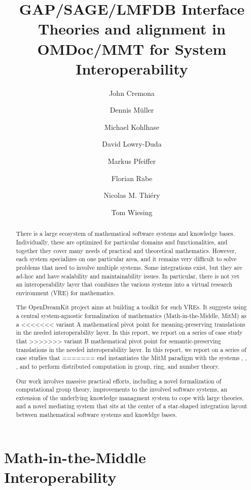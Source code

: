 \documentclass[book]{deliverablereport}
\title{GAP/SAGE/LMFDB Interface Theories and alignment in OMDoc/MMT for System Interoperability}
\author{John Cremona}
\author{Dennis M\"uller}
\author{Michael Kohlhase}
\author{David Lowry-Duda}
\author{Markus Pfeiffer}
\author{Florian Rabe}
\author{Nicolas M. Thiéry}
\author{Tom Wiesing}
\def\papertype{report\xspace}
\begin{document}
\begin{abstract}
  There is a large ecosystem of mathematical software systems and knowledge bases.
  Individually, these are optimized for particular domains and functionalities, and
  together they cover many needs of practical and theoretical mathematics.  However, each
  system specializes on one particular area, and it remains very difficult to solve
  problems that need to involve multiple systems.  Some integrations exist, but they are
  ad-hoc and have scalability and maintainability issues.  In particular, there is not yet
  an interoperability layer that combines the various systems into a virtual research
  environment (VRE) for mathematics.
  
  The OpenDreamKit project aims at building a toolkit for such VREs.  It suggests using a
  central system-agnostic formalization of mathematics (Math-in-the-Middle, MitM) as a
<<<<<<< variant A
  mathematical pivot point for meaning-preserving translations in the needed
  interoperability layer.  In this \papertype, we report on a series of case study that
>>>>>>> variant B
  mathematical pivot point for semantic-preserving translations in the needed
  interoperability layer.  In this \papertype, we report on a series of case studies that
======= end
  instantiates the MitM paradigm with the systems \GAP, \Sage, \LMFDB, and
  \Singular{} to perform distributed computation in group,
  ring, and number theory.
 
  Our work involves massive practical efforts, including a novel formalization of
  computational group theory, improvements to the involved software systems, an extension
  of the underlying knowledge managment system to cope with large theories, and a novel
  mediating system that sits at the center of a star-shaped integration layout between
  mathematical software systems and knowldge bases.
\end{abstract}

\maketitle
\setcounter{tocdepth}{2}
\newpage\tableofcontents\newpage
{}



\section[MitM Interoperability]{Math-in-the-Middle Interoperability}\label{sec:mitm}

\end{document}
